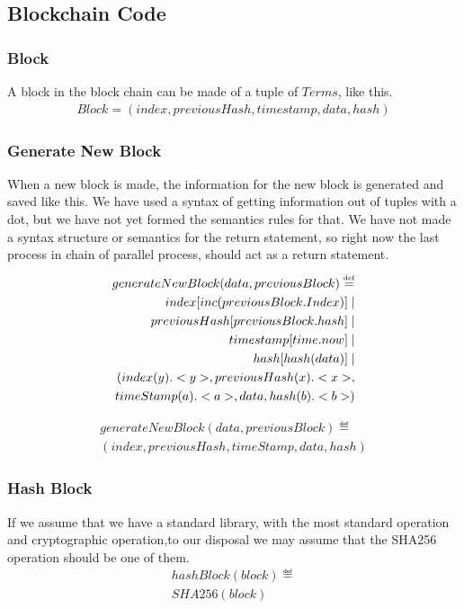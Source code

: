 \subsection{Blockchain Code}

\subsubsection{Block}
A block in the block chain can be made of a tuple of $Terms$, like this.
\begin{align*}
    Block = (index, previousHash, timestamp, data, hash)
\end{align*}

\subsubsection{Generate New Block}
When a new block is made, the information for the new block is generated and saved like this. We have used a syntax of getting information out of tuples with a dot, but we have not yet formed the semantics rules for that. We have not made a syntax structure or semantics for the return statement, so right now the last process in chain of parallel process, should act as a return statement.
\begin{align*}
    generateNewBlock(data, previousBlock)\overset{\underset{\mathrm{def}}{}}{=} \\
    index[inc(previousBlock.Index)]\mid\\
    previousHash[previousBlock.hash] \mid \\
    timestamp[time.now] \mid \\
    hash[hash(data)] \mid \\
    (index(y).<y>, previousHash(x).<x>,\\ timeStamp(a).<a>, data, hash(b).<b>)
\end{align*}

\begin{align*}
generateNewBlock(data, previousBlock)\eqdef \\(index, previousHash, timeStamp, data, hash)
\end{align*}


\subsubsection{Hash Block}
If we assume that we have a standard library, with the most standard operation and cryptographic operation,to our disposal we may assume that the SHA256 operation should be one of them.
\begin{align*}
    hashBlock(block)\eqdef\\
    SHA256(block)\\
\end{align*}


